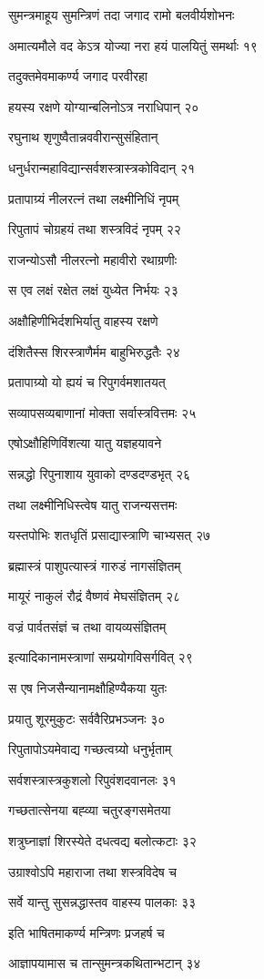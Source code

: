 सुमन्त्रमाहूय सुमन्त्रिणं तदा जगाद रामो बलवीर्यशोभनः

अमात्यमौले वद केऽत्र योज्या नरा हयं पालयितुं समर्थाः १९

तदुक्तमेवमाकर्ण्य जगाद परवीरहा

हयस्य रक्षणे योग्यान्बलिनोऽत्र नराधिपान् २०

रघुनाथ शृणुष्वैतान्नववीरान्सुसंहितान्

धनुर्धरान्महाविद्यान्सर्वशस्त्रास्त्रकोविदान् २१

प्रतापाग्र्यं नीलरत्नं तथा लक्ष्मीनिधिं नृपम्

रिपुतापं चोग्रहयं तथा शस्त्रविदं नृपम् २२

राजन्योऽसौ नीलरत्नो महावीरो रथाग्रणीः

स एव लक्षं रक्षेत लक्षं युध्येत निर्भयः २३

अक्षौहिणीभिर्दशभिर्यातु वाहस्य रक्षणे

दंशितैस्स शिरस्त्राणैर्मम बाहुभिरुद्धतैः २४

प्रतापाग्र्यो यो ह्ययं च रिपुगर्वमशातयत्

सव्यापसव्यबाणानां मोक्ता सर्वास्त्रवित्तमः २५

एषोऽक्षौहिणिविंशत्या यातु यज्ञहयावने

सन्नद्धो रिपुनाशाय युवाको दण्डदण्डभृत् २६

तथा लक्ष्मीनिधिस्त्वेष यातु राजन्यसत्तमः

यस्तपोभिः शतधृतिं प्रसाद्यास्त्राणि चाभ्यसत् २७

ब्रह्मास्त्रं पाशुपत्यास्त्रं गारुडं नागसंज्ञितम्

मायूरं नाकुलं रौद्रं वैष्णवं मेघसंज्ञितम् २८

वज्रं पार्वतसंज्ञं च तथा वायव्यसंज्ञितम्

इत्यादिकानामस्त्राणां सम्प्रयोगविसर्गवित् २९

स एष निजसैन्यानामक्षौहिण्यैकया युतः

प्रयातु शूरमुकुटः सर्ववैरिप्रभञ्जनः ३०

रिपुतापोऽयमेवाद्य गच्छत्वग्र्यो धनुर्भृताम्

सर्वशस्त्रास्त्रकुशलो रिपुवंशदवानलः ३१

गच्छतात्सेनया बह्व्या चतुरङ्गसमेतया

शत्रुघ्नाज्ञां शिरस्येते दधत्वद्य बलोत्कटाः ३२

उग्राश्वोऽपि महाराजा तथा शस्त्रविदेष च

सर्वे यान्तु सुसन्नद्धास्तव वाहस्य पालकाः ३३

इति भाषितमाकर्ण्य मन्त्रिणः प्रजहर्ष च

आज्ञापयामास च तान्सुमन्त्रकथितान्भटान् ३४

